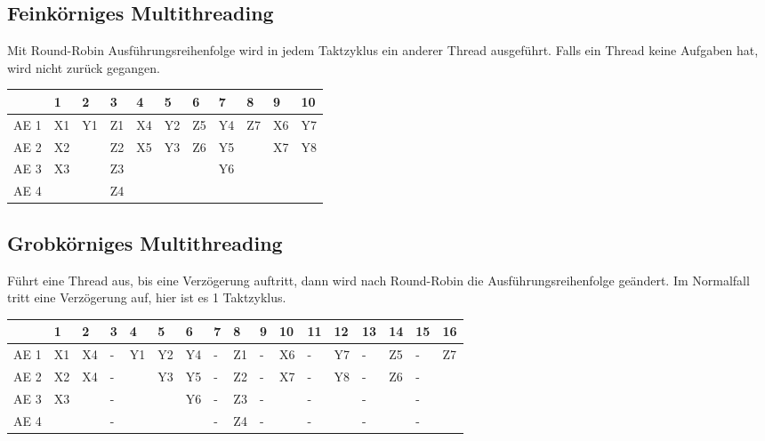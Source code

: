 \documentclass
[
	8pt,		%
	ngerman,	%
	a4paper,	%
	landscape,	%
	final		%
]{extarticle}
\begin{document}
\begin{multicols*}{4}
\subsection{Feinkörniges Multithreading}
Mit Round-Robin Ausführungsreihenfolge wird in jedem Taktzyklus ein anderer
Thread ausgeführt. Falls ein Thread keine Aufgaben hat, wird nicht zurück
gegangen. \par
\begingroup\setlength\tabcolsep{2pt}
\small
\vspace{\abovedisplayskip}
\begin{tabularx}{\linewidth}{|c|XXXXXXXXXX|}\hline
	     & 1  & 2  & 3  & 4  & 5  & 6  & 7  & 8  & 9  & 10 \\\hline
	AE 1 & X1 & Y1 & Z1 & X4 & Y2 & Z5 & Y4 & Z7 & X6 & Y7 \\
	AE 2 & X2 &    & Z2 & X5 & Y3 & Z6 & Y5 &    & X7 & Y8 \\
	AE 3 & X3 &    & Z3 &    &    &    & Y6 &    &    &    \\
	AE 4 &    &    & Z4 &    &    &    &    &    &    &    \\\hline
\end{tabularx}
\endgroup
\subsection{Grobkörniges Multithreading}
Führt eine Thread aus, bis eine Verzögerung auftritt, dann wird nach Round-Robin
die Ausführungsreihenfolge geändert. Im Normalfall tritt eine Verzögerung auf,
hier ist es 1 Taktzyklus.\par
\begingroup\setlength\tabcolsep{1.25pt}
\small
\vspace{\abovedisplayskip}
\begin{tabularx}{\linewidth}{|c|XXXXXXXXXXXXXXXX|}\hline
	     & 1  & 2  & 3 & 4  & 5  & 6  & 7 & 8  & 9 & 10 & 11 & 12 & 13 & 14 & 15 & 16 \\\hline
	AE 1 & X1 & X4 & - & Y1 & Y2 & Y4 & - & Z1 & - & X6 & -  & Y7 & -  & Z5 & -  & Z7 \\
	AE 2 & X2 & X4 & - &    & Y3 & Y5 & - & Z2 & - & X7 & -  & Y8 & -  & Z6 & -  &    \\
	AE 3 & X3 &    & - &    &    & Y6 & - & Z3 & - &    & -  &    & -  &    & -  &    \\
	AE 4 &    &    & - &    &    &    & - & Z4 & - &    & -  &    & -  &    & -  &    \\\hline
\end{tabularx}
\endgroup

\end{multicols*}
\end{document}
